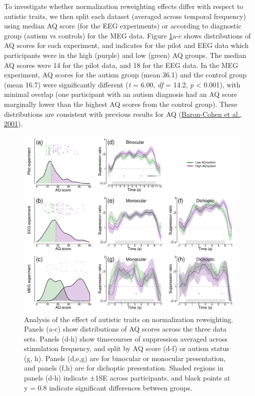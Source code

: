 \documentclass[
]{article}
\begin{document}
To investigate whether normalization reweighting effects differ with respect to autistic traits, we then split each dataset (averaged across temporal frequency) using median AQ score (for the EEG experiments) or according to diagnostic group (autism vs controls) for the MEG data. Figure \ref{fig:AQanalysis}a-c shows distributions of AQ scores for each experiment, and indicates for the pilot and EEG data which participants were in the high (purple) and low (green) AQ groups. The median AQ scores were 14 for the pilot data, and 18 for the EEG data. In the MEG experiment, AQ scores for the autism group (mean 36.1) and the control group (mean 16.7) were significantly different (\emph{t} = 6.00, \emph{df} = 14.2, \emph{p} \textless{} 0.001), with minimal overlap (one participant with an autism diagnosis had an AQ score marginally lower than the highest AQ scores from the control group). These distributions are consistent with previous results for AQ (\protect\hyperlink{ref-Baron-Cohen2001}{Baron-Cohen et al., 2001}).

\begin{figure}

{\centering \includegraphics{Figures/AQfigure} 

}

\caption{Analysis of the effect of autistic traits on normalization reweighting. Panels (a-c) show distributions of AQ scores across the three data sets. Panels (d-h) show timecourses of suppression averaged across stimulation frequency, and split by AQ score (d-f) or autism status (g, h). Panels (d,e,g) are for binocular or monocular presentation, and panels (f,h) are for dichoptic presentation. Shaded regions in panels (d-h) indicate ±1SE across participants, and black points at y = 0.8 indicate significant differences between groups.}\label{fig:AQanalysis}
\end{figure}
\end{document}

